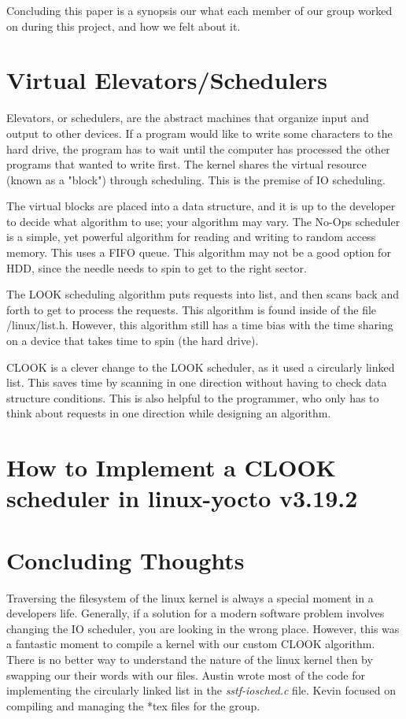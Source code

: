 \documentclass[onecolumn, draftclsnofoot,10pt, compsoc]{IEEEtran}
\begin{document}
		 Concluding this paper is a synopsis our what each member of our group worked on during this project, and how we felt about it.


		 \section{Virtual Elevators/Schedulers}
            Elevators, or schedulers, are the abstract machines that organize input and output to other devices. If a program would like to write some characters to the hard drive, the program has to wait until the computer has processed the other programs that wanted to write first. The kernel shares the virtual resource (known as a "block") through scheduling. This is the premise of IO scheduling.

            The virtual blocks are placed into a data structure, and it is up to the developer to decide what algorithm to use; your algorithm may vary.
            The No-Ops scheduler is a simple, yet powerful algorithm for reading and writing to random access memory. This uses a FIFO queue. This algorithm may not be a good option for HDD, since the needle needs to spin to get to the right sector. 

            The LOOK scheduling algorithm puts requests into list, and then scans back and forth to get to process the requests. This algorithm is found inside of the file /linux/list.h. However, this algorithm still has a time bias with the time sharing on a device that takes time to spin (the hard drive).

            CLOOK is a clever change to the LOOK scheduler, as it used a circularly linked list. This saves time by scanning in one direction without having to check data structure conditions. This is also helpful to the programmer, who only has to think about requests in one direction while designing an algorithm.

       \section{How to Implement a CLOOK scheduler in linux-yocto v3.19.2} 
        \section{Concluding Thoughts}
        Traversing the filesystem of the linux kernel is always a special moment in a developers life. Generally, if a solution for a modern software problem involves changing the IO scheduler, you are looking in the wrong place. However, this was a fantastic moment to compile a kernel with our custom CLOOK algorithm. There is no better way to understand the nature of the linux kernel then by swapping our their words with our files. Austin wrote most of the code for implementing the circularly linked list in the \textit{sstf-iosched.c} file. Kevin focused on compiling and managing the *tex files for the group. 
		
        
        
\end{document}
